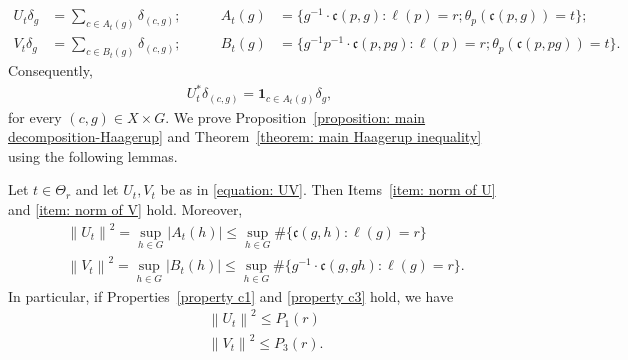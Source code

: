 \documentclass[12pt,reqno]{amsart}
\newcommand{\norm}[1]{\left\|#1\right\|}
\numberwithin{equation}{section}
\begin{document}
\begin{equation}
\label{equation: UV}
\begin{aligned}
    U_t\delta_g
    &= \sum_{c\in A_t(g)}\delta_{(c,g)};
    &\qquad
    A_t(g)
    &= \{g^{-1}\cdot \mathfrak{c}(p,g): \ell(p)=r; \theta_p(\mathfrak{c}(p,g))=t\};\\
    V_t\delta_g
    &= \sum_{c\in B_t(g)}\delta_{(c,g)};
    &\qquad
    B_t(g)
    &= \{g^{-1}p^{-1}\cdot \mathfrak{c}(p,pg): \ell(p)=r; \theta_p(\mathfrak{c}(p,pg))=t\}.
\end{aligned}
\end{equation}
Consequently,
\begin{align}\label{equation: adjoint of U}
    U^*_t\delta_{(c,g)}=\mathbf{1}_{c\in A_t(g)}\delta_g,
\end{align}
for every $(c,g)\in X\times G$. We prove Proposition~\ref{proposition: main decomposition-Haagerup} and Theorem~\ref{theorem: main Haagerup inequality} using the following lemmas.
\begin{lemma}\label{lemma: bound on norm of U_t and V_t}
    Let $t\in\Theta_r$ and let $U_t,V_t$ be as in \eqref{equation: UV}. Then Items~\ref{item: norm of U} and \ref{item: norm of V} hold. Moreover,
    \begin{align*}
        &\norm{U_t}^2=\sup_{h\in G}|A_t(h)|\le\sup_{h\in G}\#\{\mathfrak{c}(g,h): \ell(g)=r\} \\
        &\norm{V_t}^2=\sup_{h\in G}|B_t(h)|\le\sup_{h\in G}\#\{g^{-1}\cdot\mathfrak{c}(g,gh): \ell(g)=r\}.
    \end{align*}
    In particular, if Properties~\ref{property c1} and \ref{property c3} hold, we have
    \begin{align*}
        &\norm{U_t}^2\le P_1(r)\\
        &\norm{V_t}^2\le P_3(r).
    \end{align*}
\end{lemma}
\end{document}
